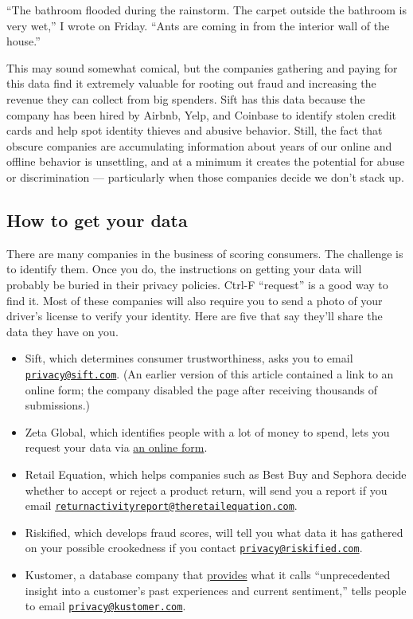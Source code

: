 ``The bathroom flooded during the rainstorm. The carpet outside the
bathroom is very wet,'' I wrote on Friday. ``Ants are coming in from the
interior wall of the house.''

This may sound somewhat comical, but the companies gathering and paying
for this data find it extremely valuable for rooting out fraud and
increasing the revenue they can collect from big spenders. Sift has this
data because the company has been hired by Airbnb, Yelp, and Coinbase to
identify stolen credit cards and help spot identity thieves and abusive
behavior. Still, the fact that obscure companies are accumulating
information about years of our online and offline behavior is
unsettling, and at a minimum it creates the potential for abuse or
discrimination --- particularly when those companies decide we don't
stack up.

\hypertarget{how-to-get-your-data}{%
\subsection{How to get your data}\label{how-to-get-your-data}}

There are many companies in the business of scoring consumers. The
challenge is to identify them. Once you do, the instructions on getting
your data will probably be buried in their privacy policies. Ctrl-F
``request'' is a good way to find it. Most of these companies will also
require you to send a photo of your driver's license to verify your
identity. Here are five that say they'll share the data they have on
you.

\begin{itemize}
\item
  Sift, which determines consumer trustworthiness, asks you to email
  \href{mailto:privacy@sift.com}{\nolinkurl{privacy@sift.com}}. (An
  earlier version of this article contained a link to an online form;
  the company disabled the page after receiving thousands of
  submissions.)
\item
  Zeta Global, which identifies people with a lot of money to spend,
  lets you request your data via
  \href{https://privacyportal-cdn.onetrust.com/dsarwebform/bc2d3301-11a5-4de5-b15e-ce796187a352/d0720d0f-d427-4a7d-a773-5d6793229f15.html}{an
  online form}.
\item
  Retail Equation, which helps companies such as Best Buy and Sephora
  decide whether to accept or reject a product return, will send you a
  report if you email
  \href{mailto:returnactivityreport@theretailequation.com}{\nolinkurl{returnactivityreport@theretailequation.com}}.
\item
  Riskified, which develops fraud scores, will tell you what data it has
  gathered on your possible crookedness if you contact
  \href{mailto:privacy@riskified.com}{\nolinkurl{privacy@riskified.com}}.
\item
  Kustomer, a database company that
  \href{https://www.kustomer.com/platform/}{provides} what it calls
  ``unprecedented insight into a customer's past experiences and current
  sentiment,'' tells people to email
  \href{mailto:privacy@kustomer.com}{\nolinkurl{privacy@kustomer.com}}.
\end{itemize}

